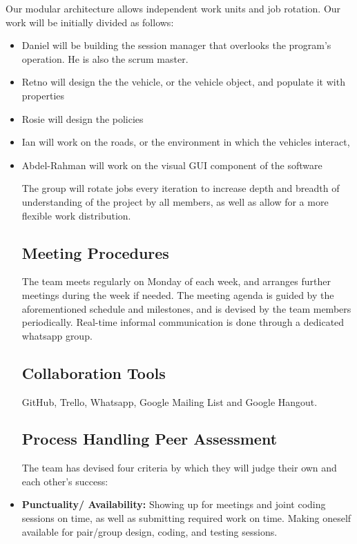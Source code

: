 \documentclass[11pt]{article}
\begin{document}
Our modular architecture allows independent work units and job rotation. Our work will be initially divided as follows:	\begin{itemize}
		\item Daniel will be building the session manager that overlooks the program’s operation. He is also the scrum master.
		\item Retno will design the the vehicle, or the vehicle object, and populate it with properties
		\item Rosie will design the policies
		\item Ian will work on the roads, or the environment in which the vehicles interact,
		\item Abdel-Rahman will work on the visual GUI component of the software

The group will rotate jobs every iteration to increase depth and breadth of understanding of the project by all members, as well as allow for a more flexible work distribution. 

\subsection{Meeting Procedures}


The team meets regularly on Monday of each week, and arranges further meetings during the week if needed. The meeting agenda is guided by the aforementioned schedule and milestones, and is devised by the team members periodically. Real-time informal communication is done through a dedicated whatsapp group.

\subsection{Collaboration Tools}

GitHub, Trello, Whatsapp, Google Mailing List and Google Hangout.


\subsection{Process Handling Peer Assessment}
The team has devised four criteria by which they will judge their own
and each other's success:

	\item \textbf{Punctuality/ Availability:}
	Showing up for meetings and joint coding sessions on time, as well as submitting required work on time.
	Making oneself available for pair/group design, coding, and testing sessions.
	

\end{itemize}
\end{document}
